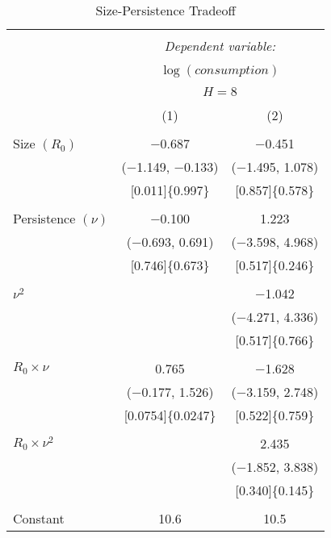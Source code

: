 \documentclass[12pt]{article}
\numberwithin{equation}{section}
\begin{document}
\begin{table}[!htb] \centering \footnotesize
    \begin{threeparttable}
    \caption{Size-Persistence Tradeoff} 
    \label{tab:Size-Persistence} 
    \begin{tabular}{@{\extracolsep{10pt}}lcc} 
      \\[-1.8ex]\hline 
      \hline \\[-1.8ex] 
       & \multicolumn{2}{c}{\textit{Dependent variable:}} \\ 
      \cline{2-3} 
      \\[-1.8ex] & \multicolumn{2}{c}{$\log(\mathit{consumption})$} \\  \\[-1.8ex]   &\multicolumn{2}{c}{$H=8$}\\
      \\[-1.8ex] & (1) & (2)\\ 
      \hline \\[-1.8ex] 
       Size $(R_0)$  & $-$0.687 & $-$0.451 \\ 
        & ($-$1.149, $-$0.133) & ($-$1.495, 1.078)    \\ 
        &[0.011]\{0.997\} & [0.857]\{0.578\}\\ 
        & & \\ 
       Persistence $(\nu)$ & $-$0.100 & 1.223 \\ 
        & ($-$0.693,  0.691)   & ($-$3.598, 4.968)    \\ 
        &[0.746]\{0.673\} & [0.517]\{0.246\}\\ 
        & & \\ 
        $\nu^2$ &  & $-$1.042 \\ 
        &  &  ($-$4.271, 4.336) \\ 
        & &[0.517]\{0.766\} \\ 
        & & \\ 
       $R_0\times \nu$ & 0.765 & $-$1.628 \\ 
        & ($-$0.177,  1.526)    &   ($-$3.159,  2.748)     \\ 
        &[0.0754]\{0.0247\} & [0.522]\{0.759\}\\ 
        & & \\ 
        $R_0\times \nu^2$ &  & 2.435 \\ 
        &  &  ($-$1.852, 3.838) \\ 
        & & [0.340]\{0.145\}\\ 
        & & \\ 
       Constant & 10.6 &10.5 \\ 

\end{tabular}
\end{threeparttable}
\end{table}
\end{document}
